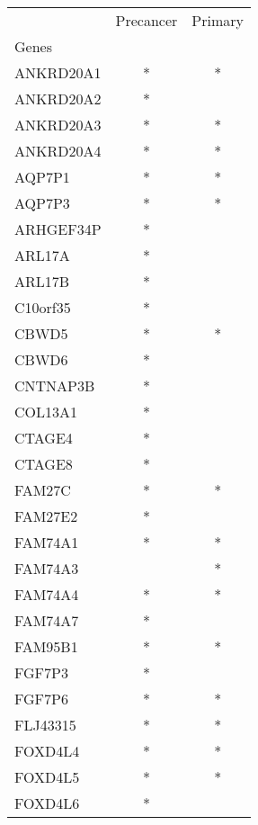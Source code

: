 \begin{tabular}{lcc}
\toprule
{} & Precancer & Primary \\
Genes              &           &         \\
\midrule
ANKRD20A1          &         * &       * \\
ANKRD20A2          &         * &         \\
ANKRD20A3          &         * &       * \\
ANKRD20A4          &         * &       * \\
AQP7P1             &         * &       * \\
AQP7P3             &         * &       * \\
ARHGEF34P          &         * &         \\
ARL17A             &         * &         \\
ARL17B             &         * &         \\
C10orf35           &         * &         \\
CBWD5              &         * &       * \\
CBWD6              &         * &         \\
CNTNAP3B           &         * &         \\
COL13A1            &         * &         \\
CTAGE4             &         * &         \\
CTAGE8             &         * &         \\
FAM27C             &         * &       * \\
FAM27E2            &         * &         \\
FAM74A1            &         * &       * \\
FAM74A3            &           &       * \\
FAM74A4            &         * &       * \\
FAM74A7            &         * &         \\
FAM95B1            &         * &       * \\
FGF7P3             &         * &         \\
FGF7P6             &         * &       * \\
FLJ43315           &         * &       * \\
FOXD4L4            &         * &       * \\
FOXD4L5            &         * &       * \\
FOXD4L6            &         * &         \\

\end{tabular}
